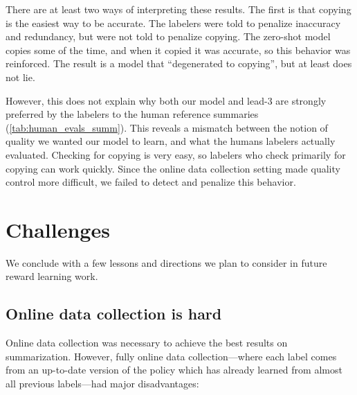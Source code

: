 There are at least two ways of interpreting these results.  The first is that copying is the easiest way to be accurate.  The labelers were told to penalize inaccuracy and redundancy, but were not told to penalize copying.  The zero-shot model copies some of the time, and when it copied it was accurate, so this behavior was reinforced.  The result is a model that ``degenerated to copying'', but at least does not lie.

However, this does not explain why both our model and lead-3 are strongly preferred by the labelers to the human reference summaries (\ref{tab:human_evals_summ}). This reveals a mismatch between the notion of quality we wanted our model to learn, and what the humans labelers actually evaluated. Checking for copying is very easy, so labelers who check primarily for copying can work quickly.  Since the online data collection setting made quality control more difficult, we failed to detect and penalize this behavior.

\section{Challenges \label{sec:challenges}}

We conclude with a few lessons and directions we plan to consider in future reward learning work.

\subsection{Online data collection is hard}

Online data collection was necessary to achieve the best results on summarization.  However, fully online data collection---where each label comes from an up-to-date version of the policy which has already learned from almost all previous labels---had major disadvantages:

